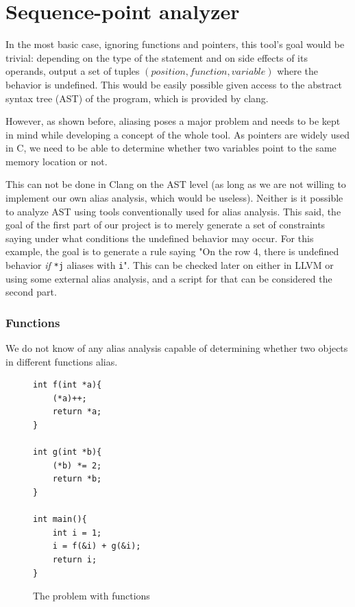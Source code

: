 \chapter{Sequence-point analyzer}
In the most basic case, ignoring functions and pointers, this tool's goal would be trivial: depending on the type of the statement and on side effects of its operands, output a set of tuples $(position, function, variable)$ where the behavior is undefined. This would be easily possible given access to the abstract syntax tree (AST) of the program, which is provided by clang.

However, as shown before, aliasing poses a major problem and needs to be kept in mind while developing a concept of the whole tool. As pointers are widely used in C, we need to be able to determine whether two variables point to the same memory location or not.

This can not be done in Clang on the AST level (as long as we are not willing to implement our own alias analysis, which would be useless). Neither is it possible to analyze AST using tools conventionally used for alias analysis. This said, the goal of the first part of our project is to merely generate a set of constraints saying under what conditions the undefined behavior may occur. For this example, the goal is to generate a rule saying "On the row 4, there is undefined behavior \emph{if} \verb|*j| aliases with \verb|i|". This can be checked later on either in LLVM or using some external alias analysis, and a script for that can be considered the second part.


\subsection{Functions}
We do not know of any alias analysis capable of determining whether two objects in different functions alias.

\begin{figure}
\caption{The problem with functions}
\label{functions-source}
\begin{lstlisting}
int f(int *a){
    (*a)++;
    return *a;
}

int g(int *b){
    (*b) *= 2;
    return *b;
}

int main(){
    int i = 1;
    i = f(&i) + g(&i);
    return i;
}
\end{lstlisting}
\end{figure}

